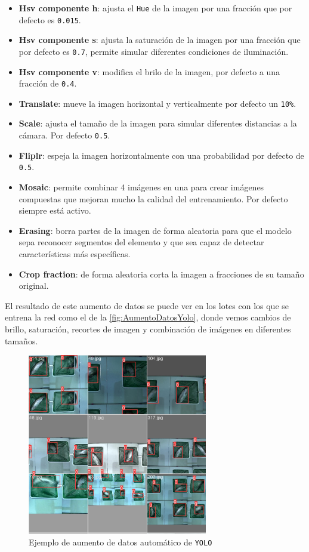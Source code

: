 \begin{itemize}
    \item \textbf{Hsv componente h}: ajusta el \texttt{Hue} de la imagen por una fracción que por defecto es \texttt{0.015}.
    \item \textbf{Hsv componente s}: ajusta la saturación de la imagen por una fracción que por defecto es \texttt{0.7}, permite simular diferentes condiciones de iluminación.
    \item \textbf{Hsv componente v}: modifica el brilo de la imagen, por defecto a una fracción de \texttt{0.4}.
    \item \textbf{Translate}: mueve la imagen horizontal y verticalmente por defecto un \texttt{10\%}.
    \item \textbf{Scale}: ajusta el tamaño de la imagen para simular diferentes distancias a la cámara. Por defecto \texttt{0.5}.
    \item \textbf{Fliplr}: espeja la imagen horizontalmente con una probabilidad por defecto de \texttt{0.5}.
    \item \textbf{Mosaic}: permite combinar 4 imágenes en una para crear imágenes compuestas que mejoran mucho la calidad del entrenamiento. Por defecto siempre está activo.
    \item \textbf{Erasing}: borra partes de la imagen de forma aleatoria para que el modelo sepa reconocer segmentos del elemento y que sea capaz de detectar características más específicas.
    \item \textbf{Crop fraction}: de forma aleatoria corta la imagen a fracciones de su tamaño original.
\end{itemize}
El resultado de este aumento de datos se puede ver en los lotes con los que se entrena la red como el de la \autoref{fig:AumentoDatosYolo}, donde vemos cambios de brillo, saturación, recortes de imagen y 
combinación de imágenes en diferentes tamaños.
\begin{figure}[H]
    \centering
    \includegraphics[width=0.7\textwidth]{images/13/a/EjemploAumento.jpg}
    \caption{Ejemplo de aumento de datos automático de \texttt{YOLO}}
    \label{fig:AumentoDatosYolo}
\end{figure}
